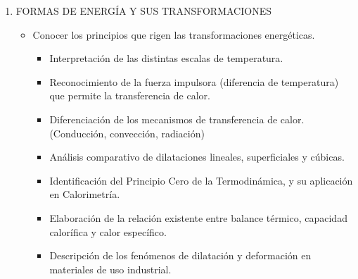 \documentclass[../main]{subfiles}
\begin{document}
\begin{enumerate}
  \item FORMAS DE ENERGÍA Y SUS TRANSFORMACIONES
    \begin{itemize}
      \item Conocer los principios que
        rigen las transformaciones
        energéticas.
        \begin{itemize}
          \item Interpretación de las distintas escalas de temperatura.
          \item Reconocimiento de la fuerza impulsora (diferencia de
            temperatura) que permite la transferencia de calor.
          \item Diferenciación de los mecanismos de transferencia de
            calor. (Conducción, convección, radiación)
          \item Análisis comparativo de dilataciones lineales, superficiales
            y cúbicas.
          \item Identificación del Principio Cero de la Termodinámica, y su
            aplicación en Calorimetría.
          \item Elaboración de la relación existente entre balance térmico,
            capacidad calorífica y calor específico.
          \item Descripción de los fenómenos de dilatación y deformación
            en materiales de uso industrial.
        \end{itemize}
    \end{itemize}


\end{enumerate}
\end{document}
